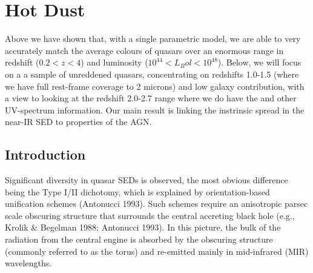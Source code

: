 

\section{Hot Dust}

Above we have shown that, with a single parametric model, we are able to very accurately match the average colours of quasars over an enormous range in redshift ($0.2 < z < 4$) and luminosity ($10^44 < L_Bol < 10^48$\ergs). 
Below, we will focus on a a sample of unreddened quasars, concentrating on redshifts 1.0-1.5 (where we have full rest-frame coverage to 2 microns) and low galaxy contribution, with a view to looking at the redshift 2.0-2.7 range where we do have the  and other UV-spectrum information. 
Our main result is linking the instrinsic spread in the near-IR SED to properties of the AGN.

\subsection{Introduction}

Significant diversity in quasar SEDs is observed, the most obvious difference being the Type I/II dichotomy, which is explained by orientation-based unification schemes (Antonucci 1993). 
Such schemes require an anisotropic parsec scale obscuring structure that surrounds the central accreting black hole (e.g., Krolik \& Begelman 1988; Antonucci 1993). 
In this picture, the bulk of the radiation from the central engine is absorbed by the obscuring structure (commonly referred to as the torus) and re-emitted mainly in mid-infrared (MIR) wavelengths. 

